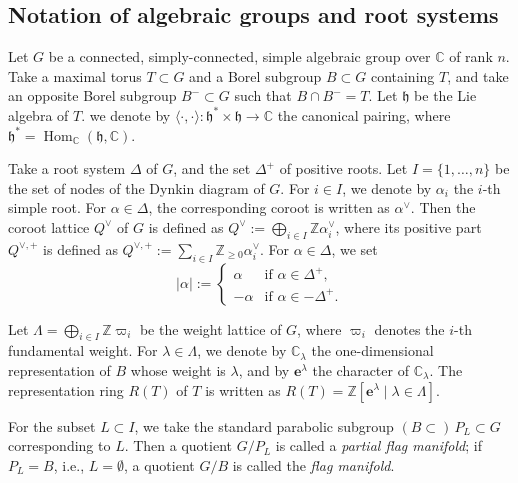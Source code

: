 \documentclass[a4paper, 11pt, reqno]{amsart}
\numberwithin{equation}{section}
\newcommand{\BZ}{\mathbb{Z}}
\newcommand{\BC}{\mathbb{C}}
\newcommand{\Fh}{\mathfrak{h}}
\newcommand{\vpi}{\varpi}
\newcommand{\e}{\mathbf{e}}
\newcommand{\pair}[2]{\langle #1, #2 \rangle}
\theoremstyle{plain}
\theoremstyle{definition}
\theoremstyle{remark}
\begin{document}
\subsection{Notation of algebraic groups and root systems}
Let $G$ be a connected, simply-connected, simple algebraic group over $\BC$ of rank $n$. 
Take a maximal torus $T \subset G$ and a Borel subgroup $B \subset G$ containing $T$, 
and take an opposite Borel subgroup $B^{-} \subset G$ such that $B \cap B^{-} = T$. 
Let $\Fh$ be the Lie algebra of $T$. we denote by $\pair{\cdot}{\cdot}: \Fh^{\ast} \times \Fh \rightarrow \BC$ the canonical pairing, where $\Fh^{\ast} = \operatorname{Hom}_{\BC}(\Fh, \BC)$. 

Take a root system $\Delta$ of $G$, and the set $\Delta^{+}$ of positive roots. 
Let $I = \{1, \ldots, n\}$ be the set of nodes of the Dynkin diagram of $G$. 
For $i \in I$, we denote by $\alpha_{i}$ the $i$-th simple root. 
For $\alpha \in \Delta$, the corresponding coroot is written as $\alpha^{\vee}$. 
Then the coroot lattice $Q^{\vee}$ of $G$ is defined as $Q^{\vee} := \bigoplus_{i \in I} \BZ \alpha_{i}^{\vee}$, where its positive part $Q^{\vee, +}$ is defined as $Q^{\vee, +} := \sum_{i \in I} \BZ_{\ge 0} \alpha_{i}^{\vee}$. 
For $\alpha \in \Delta$, we set 
\begin{equation}
|\alpha| := \begin{cases}
\alpha & \text{if $\alpha \in \Delta^{+}$}, \\ 
-\alpha & \text{if $\alpha \in -\Delta^{+}$}. 
\end{cases}
\end{equation}

Let $\Lambda = \bigoplus_{i \in I} \BZ \vpi_{i}$ be the weight lattice of $G$, where $\vpi_{i}$ denotes the $i$-th fundamental weight. 
For $\lambda \in \Lambda$, we denote by $\BC_{\lambda}$ the one-dimensional representation of $B$ whose weight is $\lambda$, and by $\e^{\lambda}$ the character of $\BC_{\lambda}$. 
The representation ring $R(T)$ of $T$ is written as $R(T) = \BZ[\e^{\lambda} \mid \lambda \in \Lambda]$. 

For the subset $L \subset I$, we take the standard parabolic subgroup $(B \subset) \, P_{L} \subset G$ corresponding to $L$. 
Then a quotient $G/P_{L}$ is called a \emph{partial flag manifold}; if $P_{L} = B$, i.e., $L = \emptyset$, a quotient $G/B$ is called the \emph{flag manifold}. 
\end{document}
